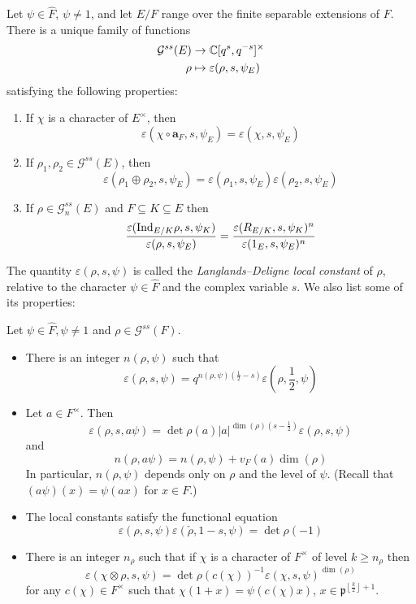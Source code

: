 \begin{thm}
	Let $\psi\in \widehat{F}$, $\psi\not=1$, and let $E/F$ range over the finite separable extensions of $F$. There is a unique family of functions
	\begin{align*}
		\mathcal{G}^{ss}(E)&\to \mathbb{C}[q^s, q^{-s}]^\times\\
		\rho &\mapsto \varepsilon(\rho, s, \psi_E)
	\end{align*}
	satisfying the following properties:
	\begin{enumerate}
		\item If $\chi$ is a character of $E^\times$, then
		\[\varepsilon(\chi\circ \mathbf{a}_F, s, \psi_E) = \varepsilon(\chi, s, \psi_E)\]
		\item If $\rho_1, \rho_2\in \mathcal{G}^{ss}(E)$, then
		\[\varepsilon(\rho_1\oplus \rho_2, s, \psi_E) = \varepsilon(\rho_1, s, \psi_E)\varepsilon(\rho_2, s, \psi_E)\] 
		\item If $\rho \in \mathcal{G}^{ss}_n(E)$ and $F\subseteq K\subseteq E$ then
		\[\frac{\varepsilon(\mathrm{Ind}_{E/K}\rho, s, \psi_K)}{\varepsilon(\rho, s, \psi_E)} = \frac{\varepsilon(R_{E/K}, s, \psi_K)^n}{\varepsilon(1_E, s, \psi_E)^n}\]
	\end{enumerate}
\end{thm}
The quantity $\varepsilon(\rho, s, \psi)$ is called the \emph{Langlands--Deligne local constant} of $\rho$, relative to the character $\psi\in \widehat{F}$ and the complex variable $s$. We also list some of its properties:

\begin{prop}
	Let $\psi\in \widehat{F}, \psi\not=1$ and $\rho \in \mathcal{G}^{ss}(F)$. 
	\begin{itemize}
		\item There is an integer $n(\rho, \psi)$ such that
		\[\varepsilon(\rho, s, \psi) = q^{n(\rho, \psi)(\frac{1}{2}-s)}\varepsilon\left(\rho, \frac{1}{2}, \psi\right)\]
		\item Let $a\in F^\times$. Then
		\[\varepsilon(\rho, s, a\psi) = \det \rho(a) |a|^{\dim(\rho)(s-\frac{1}{2})}\varepsilon(\rho, s, \psi)\]
		and
		\[n(\rho, a\psi) = n(\rho, \psi) + v_F(a)\dim(\rho)\]
		In particular, $n(\rho, \psi)$ depends only on $\rho$ and the level of $\psi$. (Recall that $(a\psi)(x) = \psi(ax)$ for $x\in F$.)
		\item The local constants satisfy the functional equation 
		\[\varepsilon(\rho, s, \psi)\varepsilon(\check{\rho}, 1-s, \psi) = \det \rho(-1)\]
		\item There is an integer $n_\rho$ such that if $\chi$ is a character of $F^\times$ of level $k\ge n_\rho$ then 
		\[\varepsilon(\chi\otimes \rho, s, \psi) = \det \rho(c(\chi))^{-1}\varepsilon(\chi, s, \psi)^{\dim(\rho)}\]
		for any $c(\chi)\in F^\times$ such that $\chi(1 + x) = \psi(c(\chi)x)$, $x\in \mathfrak{p}^{\left\lfloor \frac{k}{2}\right\rfloor+1}$.
	\end{itemize}
\end{prop}



